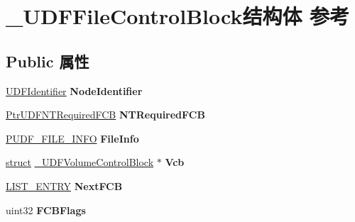 \hypertarget{struct___u_d_f_file_control_block}{}\section{\+\_\+\+U\+D\+F\+File\+Control\+Block结构体 参考}
\label{struct___u_d_f_file_control_block}
\subsection*{Public 属性}
\begin{DoxyCompactItemize}
\item 
\mbox{\label{struct___u_d_f_file_control_block_ad3873e299f4e309e9d34a2cf600f588a}} 
\hyperlink{struct___u_d_f_identifier}{U\+D\+F\+Identifier} {\bfseries Node\+Identifier}
\item 
\mbox{\label{struct___u_d_f_file_control_block_a7e7348ae00f4b379d6caff2c674e411d}} 
\hyperlink{struct___u_d_f_n_t_required_f_c_b}{Ptr\+U\+D\+F\+N\+T\+Required\+F\+CB} {\bfseries N\+T\+Required\+F\+CB}
\item 
\mbox{\label{struct___u_d_f_file_control_block_ae2948a72ea1c1e3632047aa97d8df52b}} 
\hyperlink{struct___u_d_f___f_i_l_e___i_n_f_o}{P\+U\+D\+F\+\_\+\+F\+I\+L\+E\+\_\+\+I\+N\+FO} {\bfseries File\+Info}
\item 
\mbox{\label{struct___u_d_f_file_control_block_a1454fdc9043fb4316278238a5982912e}} 
\hyperlink{interfacestruct}{struct} \hyperlink{struct___u_d_f_volume_control_block}{\+\_\+\+U\+D\+F\+Volume\+Control\+Block} $\ast$ {\bfseries Vcb}
\item 
\mbox{\label{struct___u_d_f_file_control_block_affc55a325f40776c457188f8e383b027}} 
\hyperlink{struct___l_i_s_t___e_n_t_r_y}{L\+I\+S\+T\+\_\+\+E\+N\+T\+RY} {\bfseries Next\+F\+CB}
\item 
\mbox{\label{struct___u_d_f_file_control_block_a3c4b890130c6853242b3896bc6ebf0b3}} 
uint32 {\bfseries F\+C\+B\+Flags}
\item 
\mbox{\label{struct___u_d_f_file_control_block_af9c2b6e02c720b4acb46d85aad53e0c7}} 

\end{DoxyCompactItemize}
